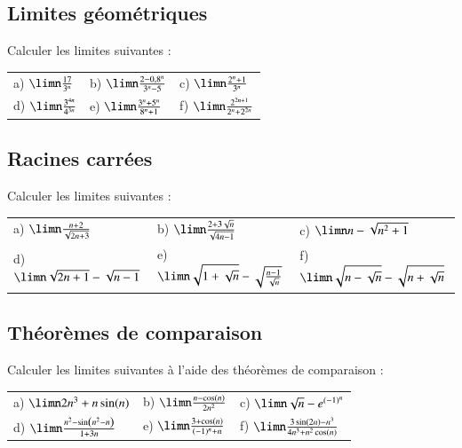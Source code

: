 \documentclass[oneside,12pt]{article}          %
\begin{document}
\subsection{Limites géométriques}
Calculer les limites suivantes :

\renewcommand{\arraystretch}{1.5}
\begin{tabular}{p{} p{} p{}}
	a) $\limn\frac{17}{3^n}$ & b) $\limn \frac{2 - 0,8^n}{3^n - 5}$ & c) $\limn \frac{2^n + 1}{3^n}$\\
	d) $\limn \frac{3^{4n}}{4^{3n}}$ & e) $\limn \frac{3^n + 5^n}{8^n + 1}$ & f) $\limn \frac{2^{2n + 1}}{2^n + 2^{2n}}$
\end{tabular}



\subsection{Racines carrées}
Calculer les limites suivantes :

\renewcommand{\arraystretch}{1.5}
\begin{tabular}{p{} p{} p{}}
    a) $\limn \frac{n+2}{\sqrt{2n+3}}$ & b) $\limn \frac{2+3\sqrt{n}}{\sqrt{4n-1}}$ & c) $\limn n-\sqrt{n^2+1}$\\
    d) $\limn \sqrt{2n+1}-\sqrt{n-1}$ & e) $\limn \sqrt{1+\sqrt{n}}-\sqrt{\frac{n-1}{\sqrt{n}}}$ & f) $\limn \sqrt{n-\sqrt{n}}-\sqrt{n+\sqrt{n}}$
\end{tabular}



\subsection{Théorèmes de comparaison}
Calculer les limites suivantes à l'aide des théorèmes de comparaison :

\begin{tabular}{p{} p{} p{}}
    a) $\limn 2n^3+n\sin(n)$ & b) $\limn \frac{n-\cos(n)}{2n^2}$ & c) $\limn \sqrt{n}-e^{(-1)^n}$\\
    d) $\limn \frac{n^2-\sin\left(n^2-n\right)}{1+3n}$ & e) $\limn \frac{3+\cos(n)}{(-1)^n+n}$ & f) $\limn \frac{3\sin(2n)-n^3}{4n^3+n^2\cos(n)}$
\end{tabular}
\end{document}
